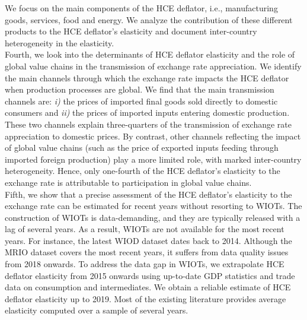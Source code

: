 \documentclass[11pt,a4paper]{paper} %
\begin{document}
We focus on the main components of the HCE deflator, i.e., manufacturing goods, services, food and energy. 
We analyze the contribution of these different products to the HCE deflator's elasticity and document inter-country heterogeneity in the elasticity.\\
Fourth, we look into the determinants of HCE deflator elasticity and the role of global value chains in the transmission of exchange rate appreciation. 
We identify the main channels through which the exchange rate impacts the HCE deflator when production processes are global.
We find that the main transmission channels are:
\textit{i)} the prices of imported ﬁnal goods sold directly to domestic consumers and
\textit{ii)} the prices of imported inputs entering domestic production. 
These two channels explain three-quarters of the transmission of exchange rate appreciation  to domestic prices.
By contrast, other channels reflecting the impact of global value chains (such as the price of exported inputs feeding through imported foreign production) play a more limited role, with marked inter-country heterogeneity.
Hence, only one-fourth of the HCE deflator's elasticity to the exchange rate is attributable to participation in global value chains.\\
Fifth, we show that a precise assessment of the HCE deflator's elasticity to the exchange rate can be estimated for recent years without resorting to WIOTs. 
The construction of WIOTs is data-demanding, and they are typically released with a lag of several years.
As a result, WIOTs are not available for the most recent years. For instance, the latest WIOD dataset dates back to 2014. 
Although the MRIO dataset covers the most recent years, it suffers from data quality issues from 2018 onwards. 
To address the data gap in WIOTs, we extrapolate HCE deflator elasticity from 2015 onwards using up-to-date GDP statistics and trade data on consumption and intermediates.
We obtain a reliable estimate of HCE deflator elasticity up to 2019.
Most of the existing literature provides average elasticity computed over a sample of several years. 
\end{document}
